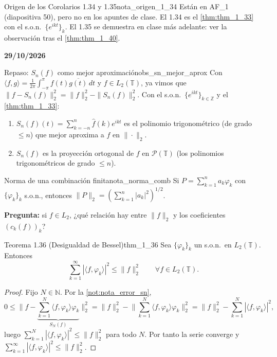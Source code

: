 \begin{nota}{Origen de los Corolarios 1.34 y 1.35}{nota_origen_1_34}
Están en AF\_1 (diapositiva 50), pero no en los apuntes de clase. El 1.34 es el \cref{thm:thm_1_33} con el s.o.n.\ $\{e^{ikt}\}_k$. El 1.35 se demuestra en clase más adelante: ver la observación tras el \cref{thm:thm_1_40}.
\end{nota}

\textbf{29/10/2026}

\begin{observacion}{Repaso: $S_n(f)$ como mejor aproximación}{obs_sn_mejor_aprox}
Con $\langle f, g\rangle = \frac{1}{2\pi}\int_{-\pi}^{\pi} f(t)\overline{g(t)}\,dt$ y $f \in L_2(\mathbb{T})$, ya vimos que $\|f - S_n(f)\|_2^2 = \|f\|_2^2 - \|S_n(f)\|_2^2$. Con el s.o.n.\ $\{e^{ikt}\}_{k\in\mathbb{Z}}$ y el \cref{thm:thm_1_33}:
\begin{enumerate}
\item[(1)] $S_n(f)(t) = \sum_{k=-n}^{n}\hat{f}(k)e^{ikt}$ es el polinomio trigonométrico (de grado $\le n$) que mejor aproxima a $f$ en $\|\cdot\|_2$.
\item[(2)] $S_n(f)$ es la proyección ortogonal de $f$ en $\mathcal{P}(\mathbb{T})$ (los polinomios trigonométricos de grado $\le n$).
\end{enumerate}
\end{observacion}

\begin{nota}{Norma de una combinación finita}{nota_norma_comb}
Si $P = \sum_{k=1}^{n} a_k\varphi_k$ con $\{\varphi_k\}_k$ s.o.n., entonces $\|P\|_2 = \left(\sum_{k=1}^{n}|a_k|^2\right)^{1/2}$.
\end{nota}

\textbf{Pregunta:} si $f \in L_2$, ¿qué relación hay entre $\|f\|_2$ y los coeficientes $(c_k(f))_k$?

\begin{teorema}{Teorema 1.36 (Desigualdad de Bessel)}{thm_1_36}
Sea $\{\varphi_k\}_k$ un s.o.n.\ en $L_2(\mathbb{T})$. Entonces
\[
\sum_{k=1}^{\infty}|\langle f, \varphi_k\rangle|^2 \le \|f\|_2^2 \qquad \forall f \in L_2(\mathbb{T}).
\]
\end{teorema}

\begin{proof}
Fijo $N \in \mathbb{N}$. Por la \cref{not:nota_error_sn},
\[
0 \le \Big\|f - \underbrace{\sum_{k=1}^{N}\langle f, \varphi_k\rangle\varphi_k}_{S_N(f)}\Big\|_2^2 = \|f\|_2^2 - \Big\|\sum_{k=1}^{N}\langle f, \varphi_k\rangle\varphi_k\Big\|_2^2 = \|f\|_2^2 - \sum_{k=1}^{N}|\langle f, \varphi_k\rangle|^2,
\]
luego $\sum_{k=1}^{N}|\langle f, \varphi_k\rangle|^2 \le \|f\|_2^2$ para todo $N$. Por tanto la serie converge y $\sum_{k=1}^{\infty}|\langle f, \varphi_k\rangle|^2 \le \|f\|_2^2$.
\end{proof}

